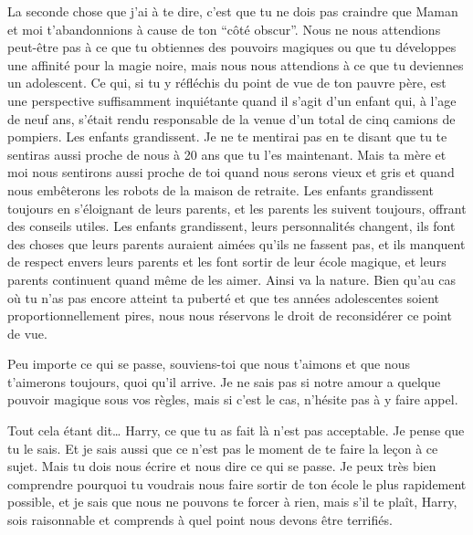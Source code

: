 \begin{writtenNote}
La seconde chose que j'ai à te dire, c'est que tu ne dois pas craindre que Maman et moi t'abandonnions à cause de ton “côté obscur”.
Nous ne nous attendions peut-être pas à ce que tu obtiennes des pouvoirs magiques ou que tu développes une affinité pour la magie noire, mais nous nous attendions à ce que tu deviennes un adolescent.
Ce qui, si tu y réfléchis du point de vue de ton pauvre père, est une perspective suffisamment inquiétante quand il s'agit d'un enfant qui, à l'age de neuf ans, s'était rendu responsable de la venue d'un total de cinq camions de pompiers.
Les enfants grandissent.
Je ne te mentirai pas en te disant que tu te sentiras aussi proche de nous à 20 ans que tu l'es maintenant.
Mais ta mère et moi nous sentirons aussi proche de toi quand nous serons vieux et gris et quand nous embêterons les robots de la maison de retraite.
Les enfants grandissent toujours en s'éloignant de leurs parents, et les parents les suivent toujours, offrant des conseils utiles.
Les enfants grandissent, leurs personnalités changent, ils font des choses que leurs parents auraient aimées qu'ils ne fassent pas, et ils manquent de respect envers leurs parents et les font sortir de leur école magique, et leurs parents continuent quand même de les aimer.
Ainsi va la nature.
Bien qu'au cas où tu n'as pas encore atteint ta puberté et que tes années adolescentes soient proportionnellement pires, nous nous réservons le droit de reconsidérer ce point de vue.

Peu importe ce qui se passe, souviens-toi que nous t'aimons et que nous t'aimerons toujours, quoi qu'il arrive.
Je ne sais pas si notre amour a quelque pouvoir magique sous vos règles, mais si c'est le cas, n'hésite pas à y faire appel.

Tout cela étant dit…
Harry, ce que tu as fait là n'est pas acceptable.
Je pense que tu le sais.
Et je sais aussi que ce n'est pas le moment de te faire la leçon à ce sujet.
Mais tu dois nous écrire et nous dire ce qui se passe.
Je peux très bien comprendre pourquoi tu voudrais nous faire sortir de ton école le plus rapidement possible, et je sais que nous ne pouvons te forcer à rien, mais s'il te plaît, Harry, sois raisonnable et comprends à quel point nous devons être terrifiés.


\end{writtenNote}
